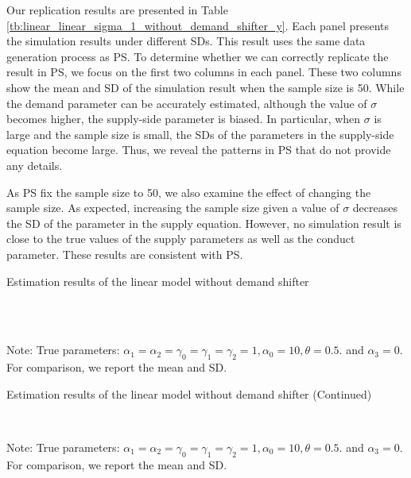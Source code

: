 \documentclass[11pt, a4paper]{article}
\begin{document}
Our replication results are presented in Table \ref{tb:linear_linear_sigma_1_without_demand_shifter_y}.
Each panel presents the simulation results under different SDs.
This result uses the same data generation process as PS. 
To determine whether we can correctly replicate the result in PS, we focus on the first two columns in each panel.
These two columns show the mean and SD of the simulation result when the sample size is 50.
While the demand parameter can be accurately estimated, although the value of $\sigma$ becomes higher, the supply-side parameter is biased.
In particular, when $\sigma$ is large and the sample size is small, the SDs of the parameters in the supply-side equation become large.
Thus, we reveal the patterns in PS that do not provide any details.

As PS fix the sample size to 50, we also examine the effect of changing the sample size.
As expected, increasing the sample size given a value of $\sigma$ decreases the SD of the parameter in the supply equation.
However, no simulation result is close to the true values of the supply parameters as well as the conduct parameter.
These results are consistent with PS.

\begin{table}[!htbp]
  \begin{center}
      \caption{Estimation results of the linear model without demand shifter}
      \label{tb:linear_linear_sigma_1_without_demand_shifter_y} 
      \subfloat[$\sigma=0.001$]{}\\
      \subfloat[$\sigma=0.5$]{}\\
  \end{center}\footnotesize
  Note: True parameters: $\alpha_1 = \alpha_2 =  \gamma_0 = \gamma_1 = \gamma_2  =  1, \alpha_0 = 10, \theta = 0.5.$ and $\alpha_3 =0$. For comparison, we report the mean and SD.
\end{table} 

\begin{table}[!htbp]
  \ContinuedFloat
  \begin{center}
      \caption{Estimation results of the linear model without demand shifter (Continued)}
      \subfloat[$\sigma=1.0$]{}\\
    \subfloat[$\sigma=2.0$]{}
  \end{center}\footnotesize
  Note: True parameters: $\alpha_1 = \alpha_2 =  \gamma_0 = \gamma_1 = \gamma_2  =  1, \alpha_0 = 10, \theta = 0.5.$ and $\alpha_3 =0$. For comparison, we report the mean and SD.
\end{table} 
\end{document}
